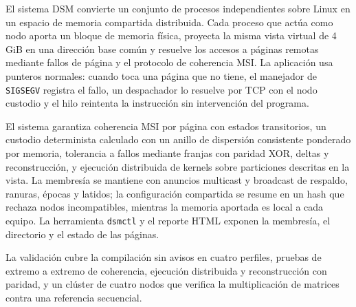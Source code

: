 El sistema DSM convierte un conjunto de procesos independientes sobre Linux en un espacio de memoria compartida distribuida. Cada proceso que actúa como nodo aporta un bloque de memoria física, proyecta la misma vista virtual de 4 GiB en una dirección base común y resuelve los accesos a páginas remotas mediante fallos de página y el protocolo de coherencia MSI. La aplicación usa punteros normales: cuando toca una página que no tiene, el manejador de \texttt{SIGSEGV} registra el fallo, un despachador lo resuelve por TCP con el nodo custodio y el hilo reintenta la instrucción sin intervención del programa.

El sistema garantiza coherencia MSI por página con estados transitorios, un custodio determinista calculado con un anillo de dispersión consistente ponderado por memoria, tolerancia a fallos mediante franjas con paridad XOR, deltas y reconstrucción, y ejecución distribuida de kernels sobre particiones descritas en la vista. La membresía se mantiene con anuncios multicast y broadcast de respaldo, ranuras, épocas y latidos; la configuración compartida se resume en un hash que rechaza nodos incompatibles, mientras la memoria aportada es local a cada equipo. La herramienta \texttt{dsmctl} y el reporte HTML exponen la membresía, el directorio y el estado de las páginas.

La validación cubre la compilación sin avisos en cuatro perfiles, pruebas de extremo a extremo de coherencia, ejecución distribuida y reconstrucción con paridad, y un clúster de cuatro nodos que verifica la multiplicación de matrices contra una referencia secuencial.
